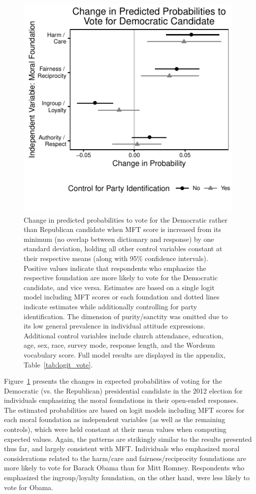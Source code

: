 \documentclass[12pt]{article}
\begin{document}
\begin{figure}[ht]\centering
\includegraphics[scale=.9]{../calc/fig/logit_vote.pdf}
\caption{Change in predicted probabilities to vote for the Democratic rather than Republican candidate when MFT score is increased from its minimum (no overlap between dictionary and response) by one standard deviation, holding all other control variables constant at their respective means (along with 95\% confidence intervals). Positive values indicate that respondents who emphasize the respective foundation are more likely to vote for the Democratic candidate, and vice versa. Estimates are based on a single logit model including MFT scores or each foundation and dotted lines indicate estimates while additionally controlling for party identification. The dimension of purity/sanctity was omitted due to its low general prevalence in individual attitude expressions. Additional control variables include church attendance, education, age, sex, race, survey mode, response length, and the Wordsum vocabulary score. Full model results are displayed in the appendix, Table~\ref{tab:logit_vote}.
}\label{fig:logit_vote}
\end{figure}

Figure~\ref{fig:logit_vote} presents the changes in expected probabilities of voting for the Democratic (vs. the Republican) presidential candidate in the 2012 election for individuals emphasizing the moral foundations in their open-ended responses. The estimated probabilities are based on logit models including MFT scores for each moral foundation as independent variables (as well as  the remaining controls), which were held constant at their mean values when computing expected values. Again, the patterns are strikingly similar to the results presented thus far, and largely consistent with MFT. Individuals who emphasized moral considerations related to the harm/care and fairness/reciprocity foundations are more likely to vote for Barack Obama than for Mitt Romney. Respondents who emphasized the ingroup/loyalty foundation, on the other hand, were less likely to vote for Obama. 
\end{document}
